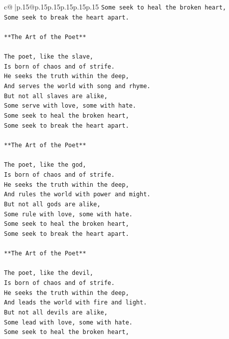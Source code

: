 \documentclass{article}
\begin{document}
{\begin{supertabular}{c@{$\;$}|p{.15\linewidth}@{}p{.15\linewidth}p{.15\linewidth}p{.15\linewidth}p{.15\linewidth}p{.15\linewidth}}
{{{\texttt{Some seek to heal the broken heart,} \\
\texttt{Some seek to break the heart apart.} \\
\\ 
\texttt{**The Art of the Poet**} \\
\\ 
\texttt{The poet, like the slave,} \\
\texttt{Is born of chaos and of strife.} \\
\texttt{He seeks the truth within the deep,} \\
\texttt{And serves the world with song and rhyme.} \\
\texttt{But not all slaves are alike,} \\
\texttt{Some serve with love, some with hate.} \\
\texttt{Some seek to heal the broken heart,} \\
\texttt{Some seek to break the heart apart.} \\
\\ 
\texttt{**The Art of the Poet**} \\
\\ 
\texttt{The poet, like the god,} \\
\texttt{Is born of chaos and of strife.} \\
\texttt{He seeks the truth within the deep,} \\
\texttt{And rules the world with power and might.} \\
\texttt{But not all gods are alike,} \\
\texttt{Some rule with love, some with hate.} \\
\texttt{Some seek to heal the broken heart,} \\
\texttt{Some seek to break the heart apart.} \\
\\ 
\texttt{**The Art of the Poet**} \\
\\ 
\texttt{The poet, like the devil,} \\
\texttt{Is born of chaos and of strife.} \\
\texttt{He seeks the truth within the deep,} \\
\texttt{And leads the world with fire and light.} \\
\texttt{But not all devils are alike,} \\
\texttt{Some lead with love, some with hate.} \\
\texttt{Some seek to heal the broken heart,} \\
}}}
\end{supertabular}}
\end{document}
